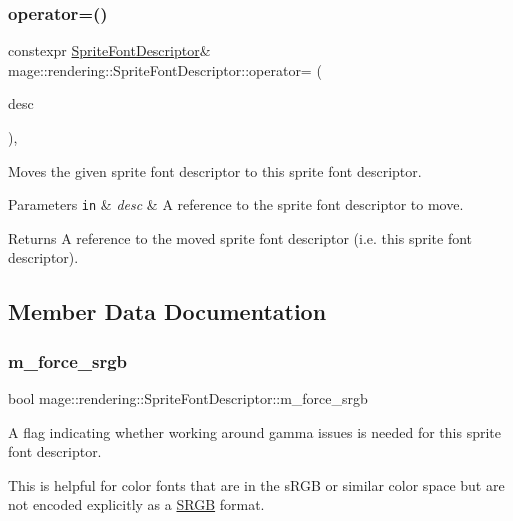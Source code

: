 \subsubsection{\texorpdfstring{operator=()}{operator=()}\hspace{0.1cm}{\footnotesize\ttfamily [2/2]}}
{\footnotesize\ttfamily constexpr \mbox{\hyperlink{classmage_1_1rendering_1_1_sprite_font_descriptor}{Sprite\+Font\+Descriptor}}\& mage\+::rendering\+::\+Sprite\+Font\+Descriptor\+::operator= (\begin{DoxyParamCaption}\item[{\mbox{\hyperlink{classmage_1_1rendering_1_1_sprite_font_descriptor}{Sprite\+Font\+Descriptor}} \&\&}]{desc }\end{DoxyParamCaption})\hspace{0.3cm}{\ttfamily [default]}, {\ttfamily [noexcept]}}

Moves the given sprite font descriptor to this sprite font descriptor.


\begin{DoxyParams}[1]{Parameters}
\mbox{\tt in}  & {\em desc} & A reference to the sprite font descriptor to move. \\
\hline
\end{DoxyParams}
\begin{DoxyReturn}{Returns}
A reference to the moved sprite font descriptor (i.\+e. this sprite font descriptor). 
\end{DoxyReturn}


\subsection{Member Data Documentation}
\mbox{\label{classmage_1_1rendering_1_1_sprite_font_descriptor_abfb5c7d28df254c483c489be55736c76}} 
\subsubsection{\texorpdfstring{m\+\_\+force\+\_\+srgb}{m\_force\_srgb}}
{\footnotesize\ttfamily bool mage\+::rendering\+::\+Sprite\+Font\+Descriptor\+::m\+\_\+force\+\_\+srgb\hspace{0.3cm}{\ttfamily [private]}}

A flag indicating whether working around gamma issues is needed for this sprite font descriptor.

This is helpful for color fonts that are in the s\+R\+GB or similar color space but are not encoded explicitly as a \mbox{\hyperlink{structmage_1_1_s_r_g_b}{S\+R\+GB}} format. 